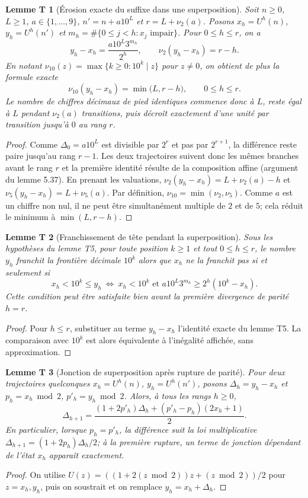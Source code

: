 \documentclass[11pt,a4paper]{article}
\newtheorem{lemme}{Lemme T}
\newcommand{\vten}{\nu_{10}}
\begin{document}
\begin{lemme}[Érosion exacte du suffixe dans une superposition]
Soit $n\ge0$, $L\ge1$, $a\in\{1,\ldots,9\}$,
$n'=n+a10^L$ et $r=L+\nu_2(a)$.
Posons $x_h=U^h(n)$, $y_h=U^h(n')$ et
$m_h=\#\{0\le j<h:x_j\text{ impair}\}$.
Pour $0\le h\le r$, on a
\[
\boxed{y_h-x_h=\frac{a10^L3^{m_h}}{2^h}},\qquad
\boxed{\nu_2(y_h-x_h)=r-h}.
\]
En notant $\nu_{10}(z)=\max\{k\ge0:10^k\mid z\}$ pour $z\neq0$,
on obtient de plus la formule exacte
\[
\boxed{\vten(y_h-x_h)=\min\bigl(L,r-h\bigr),\qquad 0\le h\le r.}
\]
Le nombre de chiffres décimaux de pied identiques commence donc à $L$,
reste égal à $L$ pendant $\nu_2(a)$ transitions, puis décroît exactement
d'une unité par transition jusqu'à $0$ au rang $r$.
\end{lemme}
\begin{proof}
Comme $\Delta_0=a10^L$ est divisible par $2^r$ et pas par $2^{r+1}$,
la différence reste paire jusqu'au rang $r-1$. Les deux trajectoires suivent
donc les mêmes branches avant le rang $r$ et la première identité résulte
de la composition affine (argument du lemme 5.37).
En prenant les valuations, $\nu_2(y_h-x_h)=L+\nu_2(a)-h$ et
$\nu_5(y_h-x_h)=L+\nu_5(a)$.
Par définition, $\nu_{10}=\min(\nu_2,\nu_5)$.
Comme $a$ est un chiffre non nul, il ne peut être simultanément
multiple de $2$ et de $5$; cela réduit le minimum à $\min(L,r-h)$.
\end{proof}

\begin{lemme}[Franchissement de tête pendant la superposition]
Sous les hypothèses du lemme T5, pour toute position $k\ge1$ et
tout $0\le h\le r$, le nombre $y_h$ franchit la frontière décimale
$10^k$ alors que $x_h$ ne la franchit pas si et seulement si
\[
\boxed{x_h<10^k\le y_h
\ \Longleftrightarrow\ 
x_h<10^k\text{ et }a10^L3^{m_h}\ge2^h(10^k-x_h).}
\]
Cette condition peut être satisfaite bien avant la première divergence
de parité $h=r$.
\end{lemme}
\begin{proof}
Pour $h\le r$, substituer au terme $y_h-x_h$ l'identité exacte
du lemme T5. La comparaison avec $10^k$ est alors équivalente à
l'inégalité affichée, sans approximation.
\end{proof}

\begin{lemme}[Jonction de superposition après rupture de parité]
Pour deux trajectoires quelconques $x_h=U^h(n)$,
$y_h=U^h(n')$, posons $\Delta_h=y_h-x_h$ et
$p_h=x_h\bmod2$, $p'_h=y_h\bmod2$.
Alors, à tous les rangs $h\ge0$,
\[
\boxed{\Delta_{h+1}
=\frac{(1+2p'_h)\Delta_h+(p'_h-p_h)(2x_h+1)}2.}
\]
En particulier, lorsque $p_h=p'_h$, la différence suit la loi
multiplicative $\Delta_{h+1}=(1+2p_h)\Delta_h/2$;
à la première rupture, un terme de jonction dépendant de l'état $x_h$
apparaît exactement.
\end{lemme}
\begin{proof}
On utilise $U(z)=((1+2(z\bmod2))z+(z\bmod2))/2$ pour $z=x_h,y_h$,
puis on soustrait et on remplace $y_h=x_h+\Delta_h$.
\end{proof}
\end{document}
